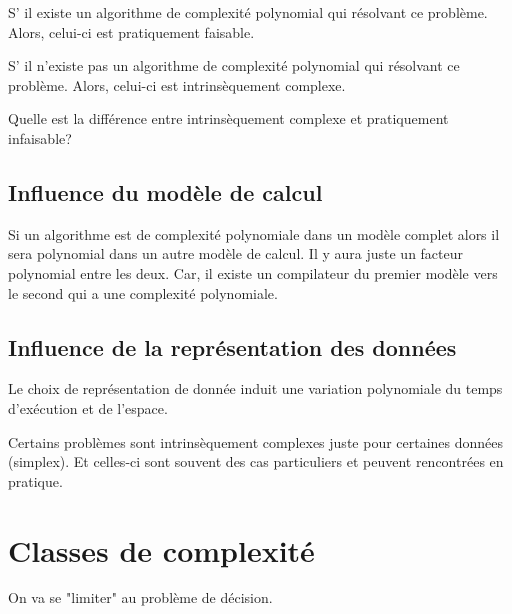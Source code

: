 \begin{mydef}
	S’ il existe un algorithme de complexité polynomial qui résolvant ce 
	problème. Alors, celui-ci est pratiquement faisable.
\end{mydef}

\begin{mydef}
	S’ il n'existe pas un algorithme de complexité polynomial qui résolvant ce 
	problème. Alors, celui-ci est intrinsèquement complexe.
\end{mydef}

\begin{myrem}
	Quelle est la différence entre intrinsèquement complexe et pratiquement 
	infaisable?
\end{myrem}

\subsection{Influence du modèle de calcul}
\label{sub:influence_du_mod_le_de_calcul}
Si un algorithme est de complexité polynomiale dans un modèle complet alors il sera 
polynomial dans un autre modèle de calcul. Il y aura juste un facteur 
polynomial entre les deux. Car, il existe un compilateur du premier modèle vers 
le second qui a une complexité polynomiale.

\subsection{Influence de la représentation des données}
\label{sub:influence_de_la_repr_sentation_des_donn_es}
Le choix de représentation de donnée induit une variation polynomiale du temps 
d'exécution et de l'espace.

\begin{myrem}
	Certains problèmes sont intrinsèquement complexes juste pour certaines 
	données (simplex). Et celles-ci sont souvent des cas particuliers et peuvent 
	rencontrées en pratique.
\end{myrem}


\section{Classes de complexité}
\label{sec:classes_de_complexit_}
On va se "limiter" au problème de décision.

